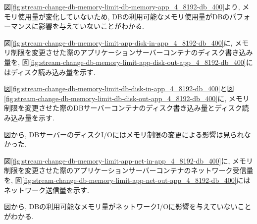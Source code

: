\documentclass[../../../../main]{subfiles}
\begin{document}
    図\ref{fig:stream-change-db-memory-limit-db-memory-app_4_8192-db_400}より, メモリ使用量が変化していないため, DBの利用可能なメモリ使用量がDBのパフォーマンスに影響を与えていないことがわかる.


    図\ref{fig:stream-change-db-memory-limit-app-disk-in-app_4_8192-db_400}に, メモリ制限を変更させた際のアプリケーションサーバーコンテナのディスク書き込み量を, 図\ref{fig:stream-change-db-memory-limit-app-disk-out-app_4_8192-db_400}にはディスク読み込み量を示す.

    
    

    図\ref{fig:stream-change-db-memory-limit-db-disk-in-app_4_8192-db_400}と図\ref{fig:stream-change-db-memory-limit-db-disk-out-app_4_8192-db_400}に, メモリ制限を変更させた際のDBサーバーコンテナのディスク書き込み量とディスク読み込み量を示す.

    
    

    図から, DBサーバーのディスクI/Oにはメモリ制限の変更による影響は見られなかった.


    図\ref{fig:stream-change-db-memory-limit-app-net-in-app_4_8192-db_400}に, メモリ制限を変更させた際のアプリケーションサーバーコンテナのネットワーク受信量を, 図\ref{fig:stream-change-db-memory-limit-app-net-out-app_4_8192-db_400}にはネットワーク送信量を示す.

    
    

    図から, DBの利用可能なメモリ量がネットワークI/Oに影響を与えていないことがわかる.
\end{document}
